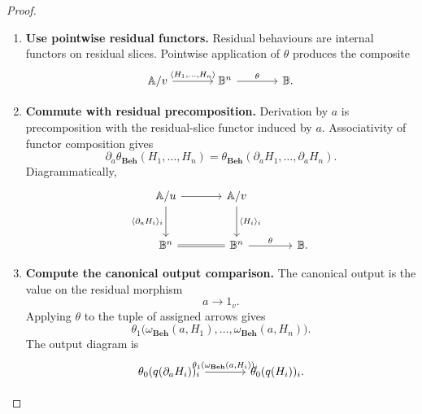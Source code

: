 \begin{proof}
    \leavevmode
    \begin{enumerate}
        \item \textbf{Use pointwise residual functors.}
        Residual behaviours are internal functors on residual slices.
        Pointwise application of \(\theta\) produces the composite
        \[
        \begin{tikzcd}[column sep=large]
            \mathbb A/v
                \arrow[r, "{\langle H_1,\dots,H_n\rangle}"]
            &
            \mathbb B^n
                \arrow[r, "\theta"]
            &
            \mathbb B.
        \end{tikzcd}
        \]

        \item \textbf{Commute with residual precomposition.}
        Derivation by \(a\) is precomposition with the residual-slice functor
        induced by \(a\). Associativity of functor composition gives
        \[
            \partial_a
            \theta_{\mathbf{Beh}}(H_1,\dots,H_n)
            =
            \theta_{\mathbf{Beh}}
            (\partial_aH_1,\dots,\partial_aH_n).
        \]
        Diagrammatically,
        \[
        \begin{tikzcd}[column sep=large, row sep=large]
            \mathbb A/u
                \arrow[r]
                \arrow[d, "{\langle\partial_aH_i\rangle_i}"']
            &
            \mathbb A/v
                \arrow[d, "{\langle H_i\rangle_i}"]
            \\
            \mathbb B^n
                \arrow[r, equal]
            &
            \mathbb B^n
                \arrow[r, "\theta"]
            &
            \mathbb B.
        \end{tikzcd}
        \]

        \item \textbf{Compute the canonical output comparison.}
        The canonical output is the value on the residual morphism
        \[
            a\to1_v.
        \]
        Applying \(\theta\) to the tuple of assigned arrows gives
        \[
            \theta_1
            \bigl(
                \omega_{\mathbf{Beh}}(a,H_1),
                \dots,
                \omega_{\mathbf{Beh}}(a,H_n)
            \bigr).
        \]
        The output diagram is
        \[
        \begin{tikzcd}[column sep=large]
            \theta_0(q(\partial_aH_i))_i
                \arrow[r,
                "{\theta_1(\omega_{\mathbf{Beh}}(a,H_i))_i}"]
            &
            \theta_0(q(H_i))_i.
        \end{tikzcd}
        \]


\end{enumerate}
\end{proof}
